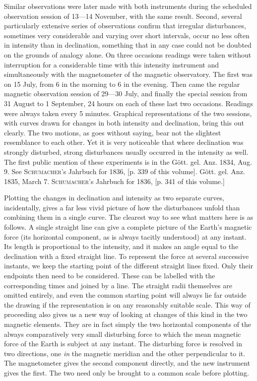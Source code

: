 \expandafter\def\csname HistoricalNoteText371\endcsname{Similar observations were later made with both instruments during the scheduled observation session of 13---14 November, with the same result.}
Second, several particularly extensive series of observations confirm that irregular disturbances, sometimes very considerable and varying over short intervals, occur no less often in intensity than in declination, something that in any case could not be doubted on the grounds of analogy alone. On three occasions readings were taken without interruption for a considerable time with this intensity instrument and simultaneously with the magnetometer of the magnetic observatory. The first was on 15 July, from 6 in the morning to 6 in the evening. Then came the regular magnetic observation session of 29---30 July, and finally the special session from 31 August to 1 September, 24 hours on each of these last two occasions. Readings were always taken every 5 minutes. Graphical representations of the two sessions, with curves drawn for changes in both intensity and declination, bring this out clearly. The two motions, as goes without saying, bear not the slightest resemblance to each other. Yet it is very noticeable that where declination was strongly disturbed, strong disturbances usually occurred in the intensity as well.
\expandafter\def\csname HistoricalNoteText376\endcsname{The first public mention of these experiments is in the Gött. gel. Anz. 1834, Aug. 9. See \textsc{Schumacher}’s Jahrbuch for 1836, [p. 339 of this volume].}
\expandafter\def\csname HistoricalNoteText376b\endcsname{Gött. gel. Anz. 1835, March 7. \textsc{Schumacher}’s Jahrbuch for 1836, [p. 341 of this volume.]}
\par
{}Plotting the changes in declination and intensity as two separate curves, incidentally, gives a far less vivid picture of how the disturbances unfold than combining them in a single curve. The clearest way to see what matters here is as follows. A single straight line can give a complete picture of the Earth’s magnetic force (its horizontal component, as is always tacitly understood) at any instant. Its length is proportional to the intensity, and it makes an angle equal to the declination with a fixed straight line. To represent the force at several successive instants, we keep the starting point of the different straight lines fixed. Only their endpoints then need to be considered. These can be labelled with the corresponding times and joined by a line. The straight radii themselves are omitted entirely, and even the common starting point will always lie far outside the drawing if the representation is on any reasonably suitable scale. This way of proceeding also gives us a new way of looking at changes of this kind in the two magnetic elements. They are in fact simply the two horizontal components of the always comparatively very small disturbing force to which the mean magnetic force of the Earth is subject at any instant. The disturbing force is resolved in two directions, one \textit{in} the magnetic meridian and the other perpendicular to it. The magnetometer gives the second component directly, and the new instrument gives the first. The two need only be brought to a common scale before plotting.

